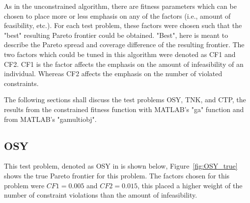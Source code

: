 \documentclass{article}
\begin{document}
\noindent As in the unconstrained algorithm, there are fitness parameters which can be chosen to place more or less emphasis on any of the factors (i.e., amount of feasibility, etc.). For each test problem, these factors were chosen such that the "best" resulting Pareto frontier could be obtained. "Best", here is meant to describe the Pareto spread and coverage difference of the resulting frontier. The two factors which could be tuned in this algorithm were denoted as CF1 and CF2. CF1 is the factor affects the emphasis on the amount of infeasibility of an individual. Whereas CF2 affects the emphasis on the number of violated constraints. \newline

\noindent The following sections shall discuss the test problems OSY, TNK, and CTP, the results from the constrained fitness function with MATLAB's "ga" function and from MATLAB's "gamultiobj". 


\subsection{OSY} 
This test problem, denoted as OSY in \cite{deb2001multi} is shown below, Figure~\ref{fig:OSY_true} shows the true Pareto frontier for this problem. The factors chosen for this problem were $CF1 = 0.005$ and $CF2 = 0.015$, this placed a higher weight of the number of constraint violations than the amount of infeasibility. 
\end{document}
